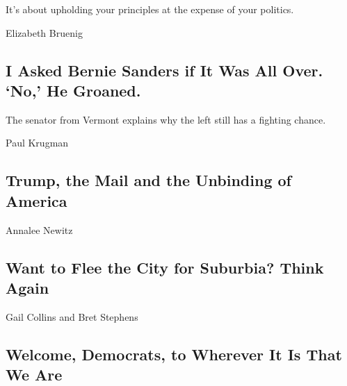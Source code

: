It's about upholding your principles at the expense of your politics.

\href{/2020/08/17/opinion/bernie-sanders-joe-biden.html}{}

Elizabeth Bruenig

\hypertarget{i-asked-bernie-sanders-if-it-was-all-over-no-he-groaned}{%
\subsection{I Asked Bernie Sanders if It Was All Over. `No,' He
Groaned.}\label{i-asked-bernie-sanders-if-it-was-all-over-no-he-groaned}}

The senator from Vermont explains why the left still has a fighting
chance.

\href{/2020/08/17/opinion/bernie-sanders-joe-biden.html}{}

\href{/2020/08/17/opinion/trump-us-mail.html}{}

Paul Krugman

\hypertarget{trump-the-mail-and-the-unbinding-of-america}{%
\subsection{Trump, the Mail and the Unbinding of
America}\label{trump-the-mail-and-the-unbinding-of-america}}

\href{/2020/08/17/opinion/coronavirus-cities-suburbs.html}{}

Annalee Newitz

\hypertarget{want-to-flee-the-city-for-suburbia-think-again}{%
\subsection{Want to Flee the City for Suburbia? Think
Again}\label{want-to-flee-the-city-for-suburbia-think-again}}

\href{/2020/08/17/opinion/trump-biden-harris-democratic-convention.html}{}

Gail Collins and Bret Stephens

\hypertarget{welcome-democrats-to-wherever-it-is-that-we-are}{%
\subsection{Welcome, Democrats, to Wherever It Is That We
Are}\label{welcome-democrats-to-wherever-it-is-that-we-are}}

\href{/2020/08/17/opinion/covid-19-heart-disease.html}{}

